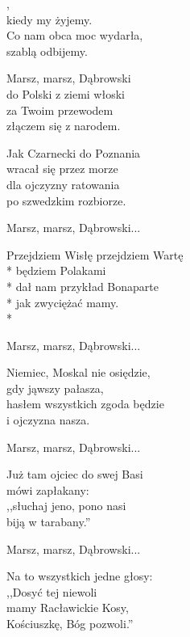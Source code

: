 \documentclass[12pt,a4paper,twoside]{songbook}
\begin{document}
  
  \begin{lyrics}[multicol=true, longestline=Przejdziem Wisłę przejdziem Wartę]
    ,\\
    kiedy my żyjemy.\\
    Co nam obca moc wydarła,\\
    szablą odbijemy.
    
    Marsz, marsz, Dąbrowski\\
    do Polski z ziemi włoski\\
    za Twoim przewodem\\
    złączem się z narodem.
    
    Jak Czarnecki do Poznania\\
    wracał się przez morze\\
    dla ojczyzny ratowania\\
    po szwedzkim rozbiorze.
    
    Marsz, marsz, Dąbrowski...
    
    
    Przejdziem Wisłę przejdziem Wartę\\*
    będziem Polakami\\*
    dał nam przykład Bonaparte\\*
    jak zwyciężać mamy.\\*
    
    Marsz, marsz, Dąbrowski...
    
    Niemiec, Moskal nie osiędzie,\\
    gdy jąwszy pałasza,\\
    hasłem wszystkich zgoda będzie\\
    i ojczyzna nasza.

    Marsz, marsz, Dąbrowski...

    Już tam ojciec do swej Basi\\
    mówi zapłakany:\\
    ,,słuchaj jeno, pono nasi\\
    biją w tarabany.''

    Marsz, marsz, Dąbrowski...

    Na to wszystkich jedne głosy:\\
    ,,Dosyć tej niewoli\\
    mamy Racławickie Kosy,\\
    Kościuszkę, Bóg pozwoli.''
  \end{lyrics}

  
\end{document}
